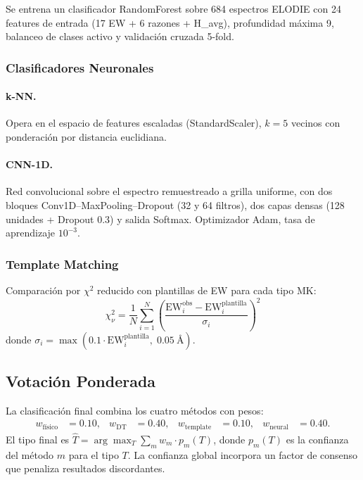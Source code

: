 \documentclass[12pt,a4paper]{article}
\begin{document}
Se entrena un clasificador RandomForest sobre 684 espectros ELODIE con 24 features de
entrada (17 EW + 6 razones + H\_avg), profundidad máxima 9, balanceo de clases activo
y validación cruzada 5-fold.

\subsubsection{Clasificadores Neuronales}

\paragraph{k-NN.} Opera en el espacio de features escaladas (StandardScaler),
$k=5$ vecinos con ponderación por distancia euclidiana.

\paragraph{CNN-1D.} Red convolucional sobre el espectro remuestreado a grilla uniforme,
con dos bloques Conv1D--MaxPooling--Dropout (32 y 64 filtros), dos capas densas
(128 unidades + Dropout 0.3) y salida Softmax. Optimizador Adam, tasa de aprendizaje
$10^{-3}$.

\subsubsection{Template Matching}

Comparación por $\chi^2$ reducido con plantillas de EW para cada tipo MK:
\begin{equation}
  \chi^2_\nu = \frac{1}{N}\sum_{i=1}^{N}
  \left(\frac{\mathrm{EW}_i^\mathrm{obs} - \mathrm{EW}_i^\mathrm{plantilla}}
  {\sigma_i}\right)^2
\end{equation}
donde $\sigma_i = \max(0.1 \cdot \mathrm{EW}_i^\mathrm{plantilla},\; 0.05\ \text{\AA})$.

\subsection{Votación Ponderada}

La clasificación final combina los cuatro métodos con pesos:
\begin{align}
  w_\mathrm{físico} &= 0.10, &
  w_\mathrm{DT} &= 0.40, &
  w_\mathrm{template} &= 0.10, &
  w_\mathrm{neural} &= 0.40.
\end{align}
El tipo final es $\hat{T} = \arg\max_T \sum_m w_m \cdot p_m(T)$,
donde $p_m(T)$ es la confianza del método $m$ para el tipo $T$.
La confianza global incorpora un factor de consenso que penaliza resultados discordantes.
\end{document}
